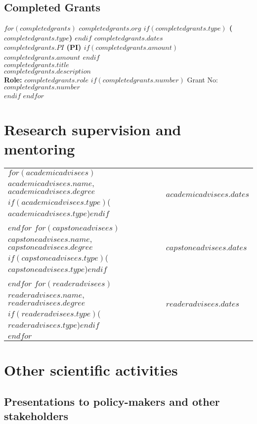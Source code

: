 \documentclass[martgin, line, 11pt]{article}
\begin{document}
\subsection*{Completed Grants}

$for(completedgrants)$
\textbf{$completedgrants.org$
$if(completedgrants.type)$
 ($completedgrants.type$)
$endif$
\hfill $completedgrants.dates$\\
$completedgrants.PI$ (PI)
\hfill
$if(completedgrants.amount)$
$completedgrants.amount$
$endif$\\
$completedgrants.title$}\\
$completedgrants.description$\\
\textbf{Role:} $completedgrants.role$
\hfill
$if(completedgrants.number)$ Grant No: $completedgrants.number$\\$endif$
$endfor$

\section*{Research supervision and mentoring}


\begin{center}
\setlength{\extrarowheight}{.25em}
\begin{tabular}{ll}   
\hline
$for(academicadvisees)$
$academicadvisees.name$, $academicadvisees.degree$
$if(academicadvisees.type)$($academicadvisees.type$)$endif$&
$academicadvisees.dates$\\
$endfor$
\hline
$for(capstoneadvisees)$
$capstoneadvisees.name$, $capstoneadvisees.degree$
$if(capstoneadvisees.type)$($capstoneadvisees.type$)$endif$&
$capstoneadvisees.dates$\\
$endfor$
\hline
$for(readeradvisees)$
$readeradvisees.name$, $readeradvisees.degree$
$if(readeradvisees.type)$($readeradvisees.type$)$endif$&
$readeradvisees.dates$\\
$endfor$
\hline
\end{tabular}
\setlength{\extrarowheight}{0em}
\end{center}

\section*{Other scientific activities}

\subsection*{Presentations to policy-makers and other stakeholders}
\end{document}
